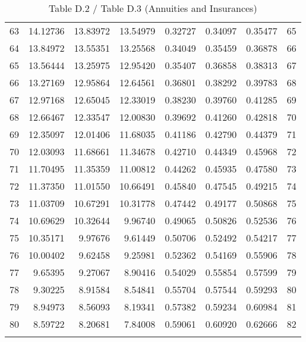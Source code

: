 \documentclass[12pt]{article}
\begin{document}
\begin{longtable}{rrrrrrrr}
  63 & 14.12736 & 13.83972 & 13.54979 & 0.32727 & 0.34097 & 0.35477 & 65 \\ 
  64 & 13.84972 & 13.55351 & 13.25568 & 0.34049 & 0.35459 & 0.36878 & 66 \\ 
  65 & 13.56444 & 13.25975 & 12.95420 & 0.35407 & 0.36858 & 0.38313 & 67 \\ 
  66 & 13.27169 & 12.95864 & 12.64561 & 0.36801 & 0.38292 & 0.39783 & 68 \\ 
  67 & 12.97168 & 12.65045 & 12.33019 & 0.38230 & 0.39760 & 0.41285 & 69 \\ 
  68 & 12.66467 & 12.33547 & 12.00830 & 0.39692 & 0.41260 & 0.42818 & 70 \\ 
  69 & 12.35097 & 12.01406 & 11.68035 & 0.41186 & 0.42790 & 0.44379 & 71 \\ 
  70 & 12.03093 & 11.68661 & 11.34678 & 0.42710 & 0.44349 & 0.45968 & 72 \\ 
  71 & 11.70495 & 11.35359 & 11.00812 & 0.44262 & 0.45935 & 0.47580 & 73 \\ 
  72 & 11.37350 & 11.01550 & 10.66491 & 0.45840 & 0.47545 & 0.49215 & 74 \\ 
  73 & 11.03709 & 10.67291 & 10.31778 & 0.47442 & 0.49177 & 0.50868 & 75 \\ 
  74 & 10.69629 & 10.32644 & 9.96740 & 0.49065 & 0.50826 & 0.52536 & 76 \\ 
  75 & 10.35171 & 9.97676 & 9.61449 & 0.50706 & 0.52492 & 0.54217 & 77 \\ 
  76 & 10.00402 & 9.62458 & 9.25981 & 0.52362 & 0.54169 & 0.55906 & 78 \\ 
  77 & 9.65395 & 9.27067 & 8.90416 & 0.54029 & 0.55854 & 0.57599 & 79 \\ 
  78 & 9.30225 & 8.91584 & 8.54841 & 0.55704 & 0.57544 & 0.59293 & 80 \\ 
  79 & 8.94973 & 8.56093 & 8.19341 & 0.57382 & 0.59234 & 0.60984 & 81 \\ 
  80 & 8.59722 & 8.20681 & 7.84008 & 0.59061 & 0.60920 & 0.62666 & 82 \\ 
  \hline
\caption{Table D.2 / Table D.3 (Annuities and Insurances)} 
\end{longtable}%
\end{document}
